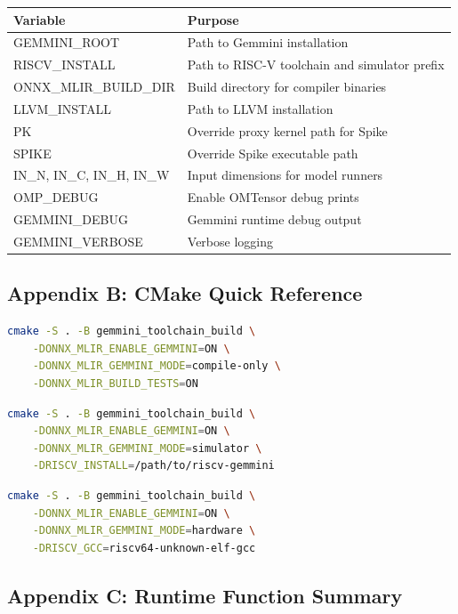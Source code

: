 \documentclass[12pt,a4paper]{article}
\begin{document}
\begin{longtable}{|p{}|p{}|}
\hline
\textbf{Variable} & \textbf{Purpose} \\
\hline
GEMMINI\_ROOT & Path to Gemmini installation \\
\hline
RISCV\_INSTALL & Path to RISC-V toolchain and simulator prefix \\
\hline
ONNX\_MLIR\_BUILD\_DIR & Build directory for compiler binaries \\
\hline
LLVM\_INSTALL & Path to LLVM installation \\
\hline
PK & Override proxy kernel path for Spike \\
\hline
SPIKE & Override Spike executable path \\
\hline
IN\_N, IN\_C, IN\_H, IN\_W & Input dimensions for model runners \\
\hline
OMP\_DEBUG & Enable OMTensor debug prints \\
\hline
GEMMINI\_DEBUG & Gemmini runtime debug output \\
\hline
GEMMINI\_VERBOSE & Verbose logging \\
\hline
\end{longtable}

\subsection{Appendix B: CMake Quick Reference}

\begin{lstlisting}[caption=Compile-Only Build, language=bash]
cmake -S . -B gemmini_toolchain_build \
    -DONNX_MLIR_ENABLE_GEMMINI=ON \
    -DONNX_MLIR_GEMMINI_MODE=compile-only \
    -DONNX_MLIR_BUILD_TESTS=ON
\end{lstlisting}

\begin{lstlisting}[caption=Simulator Build, language=bash]
cmake -S . -B gemmini_toolchain_build \
    -DONNX_MLIR_ENABLE_GEMMINI=ON \
    -DONNX_MLIR_GEMMINI_MODE=simulator \
    -DRISCV_INSTALL=/path/to/riscv-gemmini
\end{lstlisting}

\begin{lstlisting}[caption=Hardware Build, language=bash]
cmake -S . -B gemmini_toolchain_build \
    -DONNX_MLIR_ENABLE_GEMMINI=ON \
    -DONNX_MLIR_GEMMINI_MODE=hardware \
    -DRISCV_GCC=riscv64-unknown-elf-gcc
\end{lstlisting}

\subsection{Appendix C: Runtime Function Summary}
\end{document}
